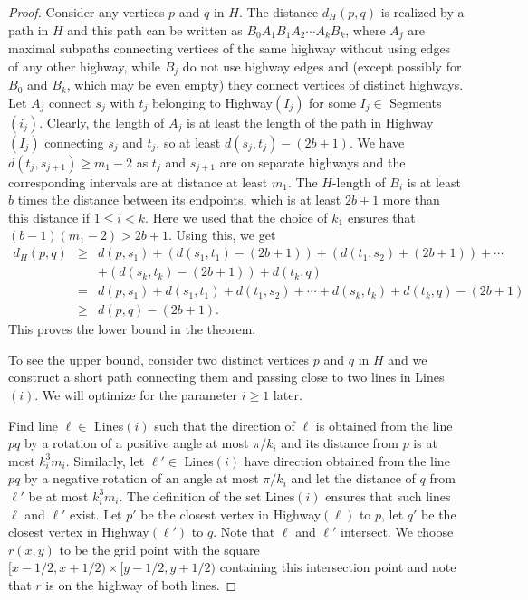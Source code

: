 \documentclass[12pt]{article}
\theoremstyle{plain}
\theoremstyle{definition}
\theoremstyle{remark}
\begin{document}
\begin{proof}
Consider any vertices $p$ and $q$ in $H$. The distance $d_H(p,q)$ is realized by a path in $H$ and this path can be written as $B_0A_1B_1A_2\cdots A_kB_k$, where $A_j$ are maximal subpaths connecting vertices of the same highway without using edges of any other highway, while $B_j$ do not use highway edges and (except possibly for $B_0$ and $B_k$, which may be even empty) they connect vertices of distinct highways. Let $A_j$ connect $s_j$ with $t_j$ belonging to Highway$(I_j)$ for some $I_j\in$ Segments$(i_j)$. Clearly, the length of $A_j$ is at least the length of the path in Highway$(I_j)$ connecting $s_j$ and $t_j$, so at least $d(s_j,t_j)-(2b+1)$. We have $d(t_j,s_{j+1})\ge m_1-2$ as $t_j$ and $s_{j+1}$ are on separate highways and the corresponding intervals are at distance at least $m_1$. The $H$-length of $B_i$ is at least $b$ times the distance between its endpoints, which is at least $2b+1$ more than this distance if $1 \le i<k$. Here we used that the choice of $k_1$ ensures that $(b-1)(m_1-2)>2b+1$. Using this, we get
\begin{eqnarray*}
d_H(p,q)&\ge&d(p,s_1)+(d(s_1,t_1)-(2b+1))+(d(t_1,s_2)+(2b+1))+\cdots\\&&+(d(s_k,t_k)-(2b+1))+d(t_k,q)\\
&=&d(p,s_1)+d(s_1,t_1)+d(t_1,s_2)+\cdots+d(s_k,t_k)+d(t_k,q)-(2b+1)\\
&\ge&d(p,q)-(2b+1).
\end{eqnarray*}
This proves the lower bound in the theorem.
\smallskip

To see the upper bound, consider two distinct vertices $p$ and $q$ in $H$ and we construct a short path connecting them and passing close to two lines in Lines$(i)$. We will optimize for the parameter $i\ge1$ later.

Find line $\ell\in$ Lines$(i)$ such that the direction of $\ell$ is obtained from the line $pq$ by a rotation of a positive angle at most $\pi/k_i$ and its distance from $p$ is at most $k_i^3m_i$. Similarly, let $\ell'\in$ Lines$(i)$ have direction obtained from the line $pq$ by a negative rotation of an angle at most $\pi/k_i$ and let the distance of $q$ from $\ell'$ be at most $k_i^3m_i$. The definition of the set Lines$(i)$ ensures that such lines $\ell$ and $\ell'$ exist. Let $p'$ be the closest vertex in Highway$(\ell)$ to $p$, let $q'$ be the closest vertex in Highway$(\ell')$ to $q$. Note that $\ell$ and $\ell'$ intersect. We choose $r(x,y)$ to be the grid point with the square $[x-1/2,x+1/2)\times[y-1/2,y+1/2)$ containing this intersection point and note that $r$ is on the highway of both lines.


\end{proof}
\end{document}
